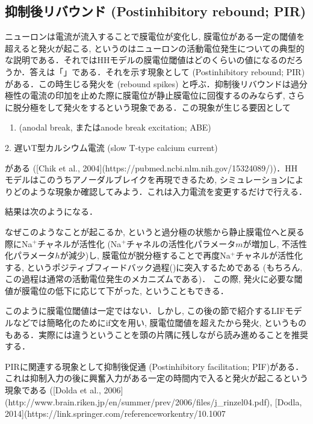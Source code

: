 \subsection{抑制後リバウンド (Postinhibitory rebound; PIR)}
ニューロンは電流が流入することで膜電位が変化し, 膜電位がある一定の閾値を超えると発火が起こる, というのはニューロンの活動電位発生についての典型的な説明である．それではHHモデルの膜電位閾値はどのくらいの値になるのだろうか．答えは「\textbf{}」である．それを示す現象として \textbf{} (Postinhibitory rebound; PIR)がある．この時生じる発火を\textbf{} (rebound spikes) 
と呼ぶ．抑制後リバウンドは過分極性の電流の印加を止めた際に膜電位が静止膜電位に回復するのみならず, さらに脱分極をして発火をするという現象である．この現象が生じる要因として

\begin{enumerate}
\item \textbf{} (anodal break, またはanode break excitation; ABE)
\end{enumerate}
2. 遅いT型カルシウム電流 (slow T-type calcium current)

がある ([Chik et al., 2004](https://pubmed.ncbi.nlm.nih.gov/15324089/))．HH モデルはこのうちアノーダルブレイクを再現できるため, シミュレーションによりどのような現象か確認してみよう．これは入力電流を変更するだけで行える．

結果は次のようになる．


なぜこのようなことが起こるか, というと過分極の状態から静止膜電位へと戻る際にNa$^+$チャネルが活性化 (Na$^+$チャネルの活性化パラメータ$m$が増加し, 不活性化パラメータ$h$が減少)し, 膜電位が脱分極することで再度Na$^+$チャネルが活性化する, というポジティブフィードバック過程(\textbf{})に突入するためである (もちろん, この過程は通常の活動電位発生のメカニズムである)． この際, 発火に必要な閾値が膜電位の低下に応じて下がった, ということもできる．

このように膜電位閾値は一定ではない．しかし, この後の節で紹介するLIFモデルなどでは簡略化のためにif文を用い, 膜電位閾値を超えたから発火, というものもある．実際には違うということを頭の片隅に残しながら読み進めることを推奨する．

PIRに関連する現象として抑制後促通 (Postinhibitory facilitation; PIF)がある．これは抑制入力の後に興奮入力がある一定の時間内で入ると発火が起こるという現象である ([Dolda et al., 2006](http://www.brain.riken.jp/en/summer/prev/2006/files/j_rinzel04.pdf), [Dodla, 2014](https://link.springer.com/referenceworkentry/10.1007%
